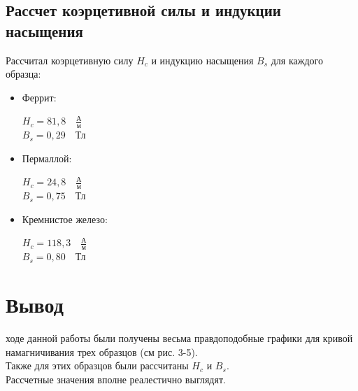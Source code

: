 \newpage

\subsection{Рассчет коэрцетивной силы и индукции насыщения}

Рассчитал коэрцетивную силу $H_c$ и индукцию насыщения $B_s$ для каждого образца:
\begin{itemize}
\item Феррит:

$H_c = 81,8 \quad \frac{\text{А}}{\text{м}}$ \\
$B_s = 0,29 \quad \text{Тл}$ \\

\item Пермаллой:

$H_c = 24,8 \quad \frac{\text{А}}{\text{м}}$ \\
$B_s = 0,75 \quad \text{Тл}$ \\

\item Кремнистое железо:

$H_c = 118,3 \quad \frac{\text{А}}{\text{м}}$ \\
$B_s = 0,80  \quad \text{Тл}$ \\
\end{itemize}

\section{Вывод}

 ходе данной работы были получены весьма правдоподобные графики для кривой намагничивания трех образцов (см рис. 3-5). \\
Также для этих образцов были рассчитаны $H_c$ и $B_s$. \\
Рассчетные значения вполне реалестично выглядят.
